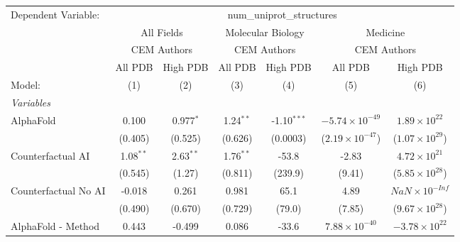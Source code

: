 \begingroup
\centering
\begin{tabular}{lcccccc}
   \tabularnewline \midrule \midrule
   Dependent Variable: & \multicolumn{6}{c}{num\_uniprot\_structures}\\
 & \multicolumn{2}{c}{All Fields} & \multicolumn{2}{c}{Molecular Biology} & \multicolumn{2}{c}{Medicine} \\
\cmidrule(lr){2-3} \cmidrule(lr){4-5} \cmidrule(lr){6-7}
 & \multicolumn{2}{c}{CEM Authors} & \multicolumn{2}{c}{CEM Authors} & \multicolumn{2}{c}{CEM Authors} \\
\cmidrule(lr){2-3} \cmidrule(lr){4-5} \cmidrule(lr){6-7}
 & \multicolumn{1}{c}{All PDB} & \multicolumn{1}{c}{High PDB} & \multicolumn{1}{c}{All PDB} & \multicolumn{1}{c}{High PDB} & \multicolumn{1}{c}{All PDB} & \multicolumn{1}{c}{High PDB} \\
\cmidrule(lr){2-2} \cmidrule(lr){3-3} \cmidrule(lr){4-4} \cmidrule(lr){5-5} \cmidrule(lr){6-6} \cmidrule(lr){7-7}
   Model:                                                     & (1)           & (2)         & (3)         & (4)           & (5)                      & (6)\\  
   \midrule
   \emph{Variables}\\
   AlphaFold                                                  & 0.100         & 0.977$^{*}$ & 1.24$^{**}$ & -1.10$^{***}$ & $-5.74\times 10^{-49}$   & $1.89\times 10^{22}$\\    
                                                              & (0.405)       & (0.525)     & (0.626)     & (0.0003)      & ($2.19\times 10^{-47}$)  & ($1.07\times 10^{29}$)\\    
   Counterfactual AI                                          & 1.08$^{**}$   & 2.63$^{**}$ & 1.76$^{**}$ & -53.8         & -2.83                    & $4.72\times 10^{21}$\\    
                                                              & (0.545)       & (1.27)      & (0.811)     & (239.9)       & (9.41)                   & ($5.85\times 10^{28}$)\\    
   Counterfactual No AI                                       & -0.018        & 0.261       & 0.981       & 65.1          & 4.89                     & $NaN\times 10^{-Inf}$\\    
                                                              & (0.490)       & (0.670)     & (0.729)     & (79.0)        & (7.85)                   & ($9.67\times 10^{28}$)\\    
   AlphaFold - Method                                         & 0.443         & -0.499      & 0.086       & -33.6         & $7.88\times 10^{-40}$    & $-3.78\times 10^{22}$\\    

\end{tabular}
